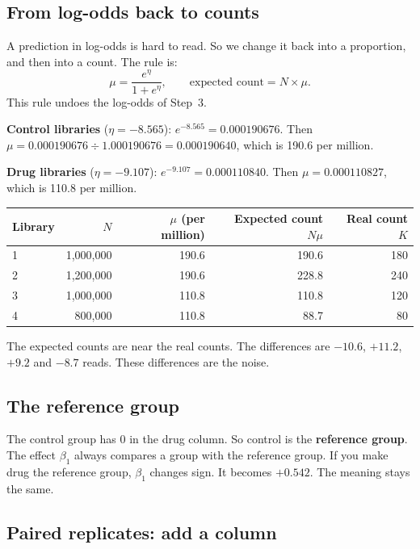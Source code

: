 \documentclass[12pt]{article}
\begin{document}
\subsection{From log-odds back to counts}

A prediction in log-odds is hard to read. So we change it back into a
proportion, and then into a count. The rule is:
\[
\mu = \frac{e^{\eta}}{1 + e^{\eta}}, \qquad
\text{expected count} = N \times \mu .
\]
This rule undoes the log-odds of Step~3.

\begin{worked}
\textbf{Control libraries} ($\eta = -8.565$):
$e^{-8.565} = 0.000190676$. Then
$\mu = 0.000190676 \div 1.000190676 = 0.000190640$, which is 190.6 per
million.

\textbf{Drug libraries} ($\eta = -9.107$):
$e^{-9.107} = 0.000110840$. Then $\mu = 0.000110827$, which is 110.8 per
million.

\begin{tabular}{@{}lrrrr@{}}
\toprule
Library & $N$ & $\mu$ (per million) & Expected count $N\mu$ & Real count $K$\\
\midrule
1 & 1{,}000{,}000 & 190.6 & 190.6 & 180\\
2 & 1{,}200{,}000 & 190.6 & 228.8 & 240\\
3 & 1{,}000{,}000 & 110.8 & 110.8 & 120\\
4 &   800{,}000 & 110.8 &  88.7 &  80\\
\bottomrule
\end{tabular}

\smallskip
The expected counts are near the real counts. The differences are
$-10.6$, $+11.2$, $+9.2$ and $-8.7$ reads. These differences are the noise.
\end{worked}

\subsection{The reference group}

The control group has 0 in the drug column. So control is the
\textbf{reference group}. The effect $\beta_1$ always compares a group with
the reference group. If you make drug the reference group, $\beta_1$ changes
sign. It becomes $+0.542$. The meaning stays the same.

\subsection{Paired replicates: add a column}
\end{document}
